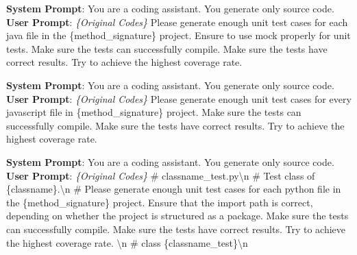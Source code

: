 

\begin{prompt_java}
\scriptsize{
\textbf{System Prompt}: You are a coding assistant. You generate only source code. \\
\textbf{User Prompt}: \textit{\{Original Codes\}} Please generate enough unit test cases for each java file in the \{method\_signature\} project. Ensure to use mock properly for unit tests. Make sure the tests can successfully compile. Make sure the tests have correct results. Try to achieve the highest coverage rate. }
\end{prompt_java}

\begin{prompt_js}
\scriptsize{
\textbf{System Prompt}: You are a coding assistant. You generate only source code. \\
\textbf{User Prompt}: \textit{\{Original Codes\}} Please generate enough unit test cases for every javascript file in \{method\_signature\} project. Make sure the tests can successfully compile. Make sure the tests have correct results. Try to achieve the highest coverage rate.}
\end{prompt_js}

\begin{prompt_comment}
\scriptsize{
\textbf{System Prompt}: You are a coding assistant. You generate only source code. \\
\textbf{User Prompt}: \textit{\{Original Codes\}} 
\# {classname}\_test.py\textbackslash n 
\# Test class of \{classname\}.\textbackslash n 
\# Please generate enough unit test cases for each python file in the \{method\_signature\} project. Ensure that the import path is correct, depending on whether the project is structured as a package. Make sure the tests can successfully compile. Make sure the tests have correct results. Try to achieve the highest coverage rate. \textbackslash n 
\# class \{classname}\_test\}\textbackslash n 
\end{prompt_comment}
